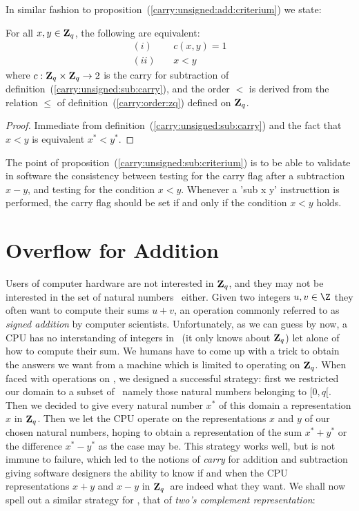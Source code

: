 \documentclass{article}
\newcommand{\zq}{\mbox{${\bf Z}_{q}$}}
\begin{document}
In similar fashion to proposition~(\ref{carry:unsigned:add:criterium}) we state:

\begin{prop}\label{carry:unsigned:sub:criterium}
  For all $x,y\in\zq$, the following are equivalent:
    \begin{eqnarray*}
      (i)&\ &c(x,y) = 1\\
      (ii)&\ & x < y
    \end{eqnarray*}
where $c:\zq\times\zq\rightarrow 2$ is the carry for subtraction of 
  definition~(\ref{carry:unsigned:sub:carry}), and the order $<$
  is derived from the relation $\leq$ of 
  definition~(\ref{carry:order:zq}) defined on \zq.
\end{prop}
\begin{proof}
Immediate from definition~(\ref{carry:unsigned:sub:carry}) and the fact 
that $x<y$ is equivalent $x^{*}<y^{*}$.
\end{proof}

The point of proposition~(\ref{carry:unsigned:sub:criterium}) is to be 
able to validate in software the consistency between testing for the 
carry flag after a subtraction $x-y$, and testing for the condition $x<y$.
Whenever a 'sub x y' instructtion is performed, the carry flag should be
set if and only if the condition $x<y$ holds.

\section{Overflow for Addition}
Users of computer hardware are not interested in \zq, and they may not be
interested in the set of natural numbers \N\ either. Given two integers 
$u,v\in\Z$ they often want to compute their sums $u+v$, an operation 
commonly referred to as {\em signed addition} by computer scientists.
Unfortunately, as we can guess by now, a CPU has no interstanding of
integers in \Z\ (it only knows about \zq) let alone of how to compute
their sum. We humans have to come up with a trick to obtain the answers
we want from a machine which is limited to operating on \zq. When faced
with operations on \N, we designed a successful strategy: first we 
restricted our domain to a subset of \N\ namely those natural numbers
belonging to $[0,q[$. Then we decided to give every natural number $x^{*}$
of this domain a representation $x$ in \zq. Then we let the CPU operate
on the representations $x$ and $y$ of our chosen natural numbers, 
hoping to obtain a representation of the sum $x^{*} + y^{*}$ or the 
difference $x^{*}-y^{*}$ as the case may be. This strategy works well,
but is not immune to failure, which led to the notions of {\em carry}
for addition and subtraction giving software designers the ability
to know if and when the CPU representations $x+y$ and $x-y$ in \zq\ 
are indeed what they want. We shall now spell out a similar strategy 
for \Z, that of {\em two's complement representation}:
\end{document}

